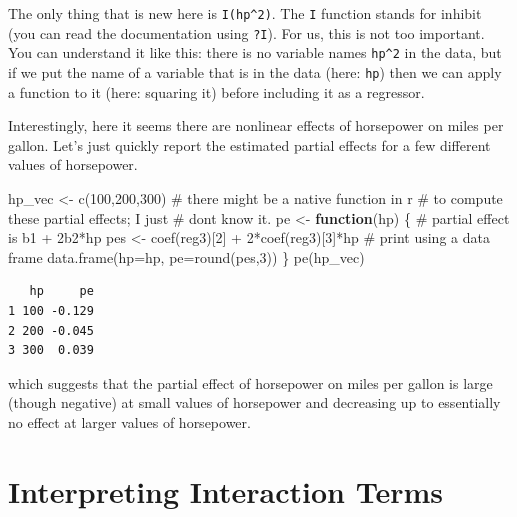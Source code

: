 \documentclass[
  letterpaper,
  DIV=11,
  numbers=noendperiod]{scrreprt}
\newenvironment{Shaded}{\begin{snugshade}}{\end{snugshade}}
\newcommand{\AttributeTok}[1]{\textcolor[rgb]{0.40,0.45,0.13}{#1}}
\newcommand{\CommentTok}[1]{\textcolor[rgb]{0.37,0.37,0.37}{#1}}
\newcommand{\ControlFlowTok}[1]{\textcolor[rgb]{0.00,0.23,0.31}{\textbf{#1}}}
\newcommand{\DecValTok}[1]{\textcolor[rgb]{0.68,0.00,0.00}{#1}}
\newcommand{\FunctionTok}[1]{\textcolor[rgb]{0.28,0.35,0.67}{#1}}
\newcommand{\NormalTok}[1]{\textcolor[rgb]{0.00,0.23,0.31}{#1}}
\newcommand{\OtherTok}[1]{\textcolor[rgb]{0.00,0.23,0.31}{#1}}
\newcommand{\SpecialCharTok}[1]{\textcolor[rgb]{0.37,0.37,0.37}{#1}}
\begin{document}
The only thing that is new here is \texttt{I(hp\^{}2)}. The \texttt{I}
function stands for inhibit (you can read the documentation using
\texttt{?I}). For us, this is not too important. You can understand it
like this: there is no variable names \texttt{hp\^{}2} in the data, but
if we put the name of a variable that is in the data (here: \texttt{hp})
then we can apply a function to it (here: squaring it) before including
it as a regressor.

Interestingly, here it seems there are nonlinear effects of horsepower
on miles per gallon. Let's just quickly report the estimated partial
effects for a few different values of horsepower.

\begin{Shaded}
\begin{Highlighting}[]
\NormalTok{hp\_vec }\OtherTok{\textless{}{-}} \FunctionTok{c}\NormalTok{(}\DecValTok{100}\NormalTok{,}\DecValTok{200}\NormalTok{,}\DecValTok{300}\NormalTok{)}
\CommentTok{\# there might be a native function in r}
\CommentTok{\# to compute these partial effects; I just}
\CommentTok{\# don\textquotesingle{}t know it.}
\NormalTok{pe }\OtherTok{\textless{}{-}} \ControlFlowTok{function}\NormalTok{(hp) \{}
  \CommentTok{\# partial effect is b1 + 2b2*hp}
\NormalTok{  pes }\OtherTok{\textless{}{-}} \FunctionTok{coef}\NormalTok{(reg3)[}\DecValTok{2}\NormalTok{] }\SpecialCharTok{+} \DecValTok{2}\SpecialCharTok{*}\FunctionTok{coef}\NormalTok{(reg3)[}\DecValTok{3}\NormalTok{]}\SpecialCharTok{*}\NormalTok{hp}
  \CommentTok{\# print using a data frame}
  \FunctionTok{data.frame}\NormalTok{(}\AttributeTok{hp=}\NormalTok{hp, }\AttributeTok{pe=}\FunctionTok{round}\NormalTok{(pes,}\DecValTok{3}\NormalTok{))}
\NormalTok{\}}
\FunctionTok{pe}\NormalTok{(hp\_vec)}
\end{Highlighting}
\end{Shaded}

\begin{verbatim}
   hp     pe
1 100 -0.129
2 200 -0.045
3 300  0.039
\end{verbatim}

which suggests that the partial effect of horsepower on miles per gallon
is large (though negative) at small values of horsepower and decreasing
up to essentially no effect at larger values of horsepower.

\section{Interpreting Interaction
Terms}\label{interpreting-interaction-terms}
\end{document}
